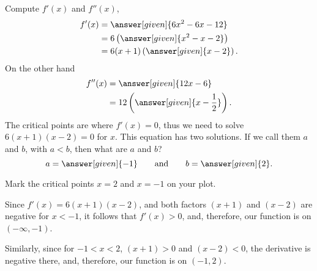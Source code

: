 \documentclass[noauthor,nooutcomes]{ximera}
\begin{document}
\begin{example}
Compute $f'(x)$ and $f''(x)$,
\begin{align*}
  f'(x) &= \answer[given]{6x^2 -6x -12}\\
  &=6\left(\answer[given]{x^2-x-2}\right)\\
  &=6(x+1)\left(\answer[given]{x-2}\right).
\end{align*}
On the other hand
\begin{align*}
  f''(x) &= \answer[given]{12x-6}\\
  &=12\left(\answer[given]{x-\frac{1}{2}}\right).
\end{align*}
The critical points are where $f'(x) = 0$, thus we need to solve
$6(x+1)(x-2) = 0$ for $x$.  This equation has two solutions.  If we
call them $a$ and $b$, with $a<b$, then what are $a$ and $b$?
\[
a = \answer[given]{-1}\qquad\text{and}\qquad b = \answer[given]{2}.
\]

Mark the critical points $x=2$ and $x=-1$ on your plot. %
\begin{image}
\end{image}
Since $f'(x)=6(x+1)(x-2)$, and both factors $(x+1)$ and $(x-2)$ are
negative for $x<-1$, it follows that $f'(x)>0$, and, therefore, our
function is  on $(-\infty,-1)$.


Similarly, since for $-1<x<2$, $(x+1)>0$ and $(x-2)<0$, the
derivative is negative there, and, therefore, our function is
 on
$(-1,2)$.




\end{example}
\end{document}

